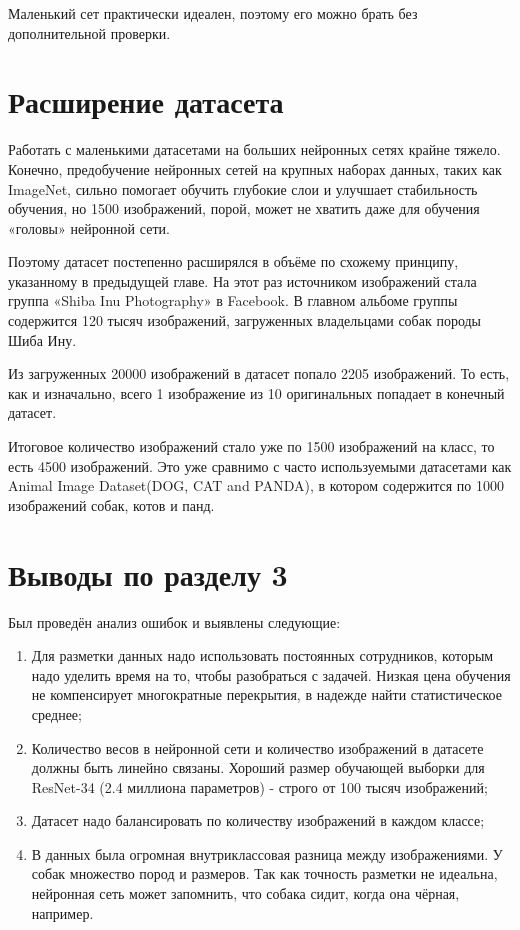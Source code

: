 Маленький сет практически идеален, поэтому его можно брать без дополнительной проверки.

\section{Расширение датасета}\label{expanding_dataset}
Работать с маленькими датасетами на больших нейронных сетях крайне тяжело. Конечно, предобучение нейронных сетей на крупных наборах данных, таких как ImageNet, сильно помогает обучить глубокие слои и улучшает стабильность обучения, но 1500 изображений, порой, может не хватить даже для обучения «головы» нейронной сети.

Поэтому датасет постепенно расширялся в объёме по схожему принципу, указанному в предыдущей главе. На этот раз источником изображений стала группа «Shiba Inu Photography» в Facebook. В главном альбоме группы содержится 120 тысяч изображений, загруженных владельцами собак породы Шиба Ину.

Из загруженных 20000 изображений в датасет попало 2205 изображений. То есть, как и изначально, всего 1 изображение из 10 оригинальных попадает в конечный датасет.

Итоговое количество изображений стало уже по 1500 изображений на класс, то есть 4500 изображений. Это уже сравнимо с часто используемыми датасетами как Animal Image Dataset(DOG, CAT and PANDA), в котором содержится по 1000 изображений собак, котов и панд. 


\section*{Выводы по разделу 3}
Был проведён анализ ошибок и выявлены следующие:
\begin{enumerate}[wide, labelwidth=!, labelindent=1.25cm]
    \item Для разметки данных надо использовать постоянных сотрудников, которым надо уделить время на то, чтобы разобраться с задачей. Низкая цена обучения не компенсирует многократные перекрытия, в надежде найти статистическое среднее;
    \item Количество весов в нейронной сети и количество изображений в датасете должны быть линейно связаны. Хороший размер обучающей выборки для ResNet-34 (2.4 миллиона параметров) - строго от 100 тысяч изображений;
    \item Датасет надо балансировать по количеству изображений в каждом классе;
    \item В данных была огромная внутриклассовая разница между изображениями. У собак множество пород и размеров. Так как точность разметки не идеальна, нейронная сеть может запомнить, что собака сидит, когда она чёрная, например. 
\end{enumerate}{}



